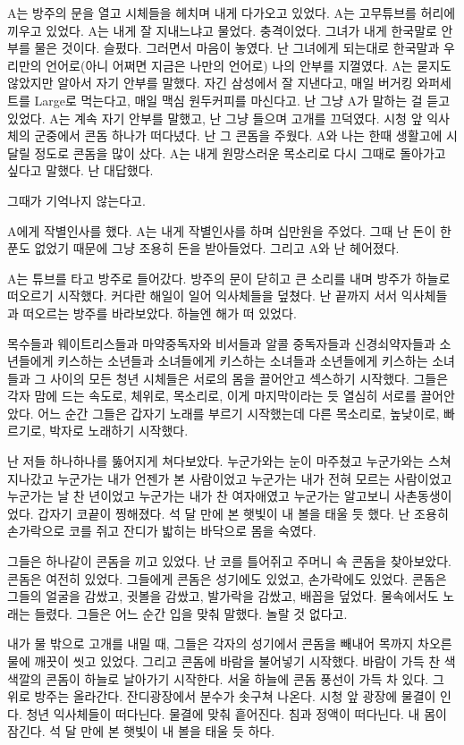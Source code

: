 \documentclass[a5paper,10pt, twoside, openright]{memoir}
\begin{document}
	A는 방주의 문을 열고 시체들을 헤치며 내게 다가오고 있었다. A는 고무튜브를 허리에 끼우고 있었다. A는 내게 잘 지내느냐고 물었다. 충격이었다. 그녀가 내게 한국말로 안부를 물은 것이다. 슬펐다. 그러면서 마음이 놓였다. 난 그녀에게 되는대로 한국말과 우리만의 언어로(아니 어쩌면 지금은 나만의 언어로) 나의 안부를 지껄였다. A는 묻지도 않았지만 알아서 자기 안부를 말했다. 자긴 삼성에서 잘 지낸다고, 매일 버거킹 와퍼세트를 Large로 먹는다고, 매일 맥심 원두커피를 마신다고. 난 그냥 A가 말하는 걸 듣고 있었다. A는 계속 자기 안부를 말했고, 난 그냥 들으며 고개를 끄덕였다. 시청 앞 익사체의 군중에서 콘돔 하나가 떠다녔다. 난 그 콘돔을 주웠다. A와 나는 한때 생활고에 시달릴 정도로 콘돔을 많이 샀다. A는 내게 원망스러운 목소리로 다시 그때로 돌아가고 싶다고 말했다. 난 대답했다. 

	그때가 기억나지 않는다고.
	
	A에게 작별인사를 했다. A는 내게 작별인사를 하며 십만원을 주었다. 그때 난 돈이 한 푼도 없었기 때문에 그냥 조용히 돈을 받아들었다. 그리고 A와 난 헤어졌다. 

	A는 튜브를 타고 방주로 들어갔다. 방주의 문이 닫히고 큰 소리를 내며 방주가 하늘로 떠오르기 시작했다. 커다란 해일이 일어 익사체들을 덮쳤다. 난 끝까지 서서 익사체들과 떠오르는 방주를 바라보았다. 하늘엔 해가 떠 있었다. 

	목수들과 웨이트리스들과 마약중독자와 비서들과 알콜 중독자들과 신경쇠약자들과 소년들에게 키스하는 소년들과 소녀들에게 키스하는 소녀들과 소년들에게 키스하는 소녀들과 그 사이의 모든 청년 시체들은 서로의 몸을 끌어안고 섹스하기 시작했다. 그들은 각자 맘에 드는 속도로, 체위로, 목소리로, 이게 마지막이라는 듯 열심히 서로를 끌어안았다. 어느 순간 그들은 갑자기 노래를 부르기 시작했는데 다른 목소리로, 높낮이로, 빠르기로, 박자로 노래하기 시작했다. 
	
	난 저들 하나하나를 뚫어지게 쳐다보았다. 누군가와는 눈이 마주쳤고 누군가와는 스쳐지나갔고 누군가는 내가 언젠가 본 사람이었고 누군가는 내가 전혀 모르는 사람이었고 누군가는 날 찬 년이었고 누군가는 내가 찬 여자애였고 누군가는 알고보니 사촌동생이었다. 갑자기 코끝이 찡해졌다. 석 달 만에 본 햇빛이 내 볼을 태울 듯 했다. 난 조용히 손가락으로 코를 쥐고 잔디가 밟히는 바닥으로 몸을 숙였다. 
	
	그들은 하나같이 콘돔을 끼고 있었다. 난 코를 틀어쥐고 주머니 속 콘돔을 찾아보았다. 콘돔은 여전히 있었다. 그들에게 콘돔은 성기에도 있었고, 손가락에도 있었다. 콘돔은 그들의 얼굴을 감쌌고, 귓볼을 감쌌고, 발가락을 감쌌고, 배꼽을 덮었다. 물속에서도 노래는 들렸다. 그들은 어느 순간 입을 맞춰 말했다. 놀랄 것 없다고.

	내가 물 밖으로 고개를 내밀 때, 그들은 각자의 성기에서 콘돔을 빼내어 목까지 차오른 물에 깨끗이 씻고 있었다. 그리고 콘돔에 바람을 불어넣기 시작했다. 바람이 가득 찬 색색깔의 콘돔이 하늘로 날아가기 시작한다. 서울 하늘에 콘돔 풍선이 가득 차 있다. 그 위로 방주는 올라간다. 잔디광장에서 분수가 솟구쳐 나온다. 시청 앞 광장에 물결이 인다. 청년 익사체들이 떠다닌다. 물결에 맞춰 흩어진다. 침과 정액이 떠다닌다. 내 몸이 잠긴다. 석 달 만에 본 햇빛이 내 볼을 태울 듯 하다.  
	
\end{document}
